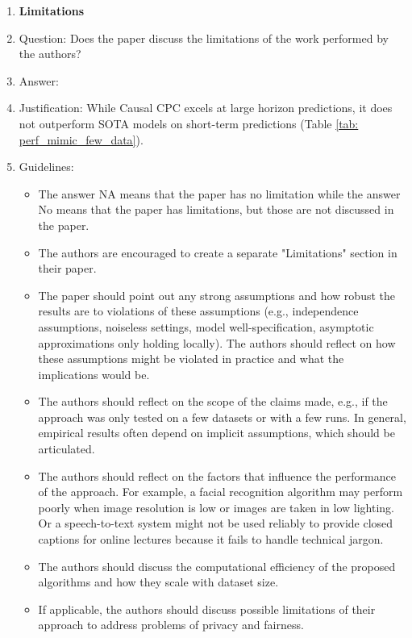 \documentclass{article}
\theoremstyle{plain}
\theoremstyle{definition}
\theoremstyle{remark}
\begin{document}
\begin{enumerate}
\item {\bf Limitations}
    \item[] Question: Does the paper discuss the limitations of the work performed by the authors?
    \item[] Answer: \answerYes{}{} %
    \item[] Justification: While Causal CPC excels at large horizon predictions, it does not outperform SOTA models on short-term predictions (Table \ref{tab: perf_mimic_few_data}). %
    \item[] Guidelines:
    \begin{itemize}
        \item The answer NA means that the paper has no limitation while the answer No means that the paper has limitations, but those are not discussed in the paper. 
        \item The authors are encouraged to create a separate "Limitations" section in their paper.
        \item The paper should point out any strong assumptions and how robust the results are to violations of these assumptions (e.g., independence assumptions, noiseless settings, model well-specification, asymptotic approximations only holding locally). The authors should reflect on how these assumptions might be violated in practice and what the implications would be.
        \item The authors should reflect on the scope of the claims made, e.g., if the approach was only tested on a few datasets or with a few runs. In general, empirical results often depend on implicit assumptions, which should be articulated.
        \item The authors should reflect on the factors that influence the performance of the approach. For example, a facial recognition algorithm may perform poorly when image resolution is low or images are taken in low lighting. Or a speech-to-text system might not be used reliably to provide closed captions for online lectures because it fails to handle technical jargon.
        \item The authors should discuss the computational efficiency of the proposed algorithms and how they scale with dataset size.
        \item If applicable, the authors should discuss possible limitations of their approach to address problems of privacy and fairness.

\end{itemize}
\end{enumerate}
\end{document}
